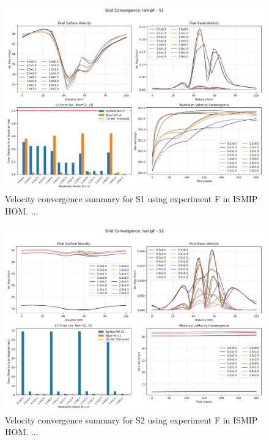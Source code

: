 \begin{figure}[H]
    \includegraphics[scale=0.40]{IsmipF_S1_convergence_summary.png}
    \caption{Velocity convergence summary for S1 using experiment F in ISMIP HOM. ...}
    \label{fig:grid_conv_S1}
\end{figure}
\begin{figure}[H]
    \includegraphics[scale=0.40]{IsmipF_S2_convergence_summary.png}
    \caption{Velocity convergence summary for S2 using experiment F in ISMIP HOM. ... }
    \label{fig:grid_conv_S2}
\end{figure}
